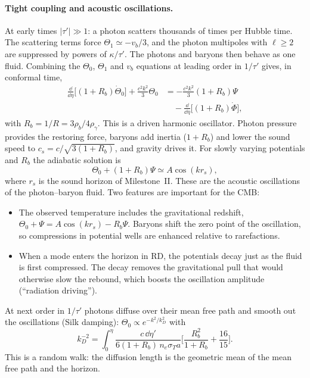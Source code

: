 \paragraph*{Tight coupling and acoustic oscillations.} At early times $|\tau'|\gg1$: a photon scatters thousands of
times per Hubble time. The scattering terms force $\Theta_1\simeq-v_b/3$, and the photon multipoles with $\ell\ge2$ are
suppressed by powers of $\kappa/\tau'$. The photons and baryons then behave as one fluid. Combining the $\Theta_0$,
$\Theta_1$ and $v_b$ equations at leading order in $1/\tau'$ gives, in conformal time,
\begin{align}
\frac{\dd}{\dd\eta}\Big[(1+R_b)\dot\Theta_0\Big] + \frac{c^2k^2}{3}\Theta_0
 &= -\frac{c^2k^2}{3}(1+R_b)\Psi \nonumber\\
 &\quad - \frac{\dd}{\dd\eta}\Big[(1+R_b)\dot\Phi\Big],
\label{eq:oscillator}
\end{align}
with $R_b=1/R=3\rho_b/4\rho_\gamma$. This is a driven harmonic oscillator. Photon pressure provides the restoring force,
baryons add inertia ($1+R_b$) and lower the sound speed to $c_s=c/\sqrt{3(1+R_b)}$, and gravity drives it. For slowly
varying potentials and $R_b$ the adiabatic solution is
\begin{equation}
\Theta_0+(1+R_b)\Psi \simeq A\cos(kr_s),
\label{eq:acoustic}
\end{equation}
where $r_s$ is the sound horizon of Milestone~II. These are the acoustic oscillations of the photon--baryon fluid. Two
features are important for the CMB:
\begin{itemize}
\item The observed temperature includes the gravitational redshift, $\Theta_0+\Psi=A\cos(kr_s)-R_b\Psi$. Baryons shift
      the zero point of the oscillation, so compressions in potential wells are enhanced relative to rarefactions.
\item When a mode enters the horizon in RD, the potentials decay just as the fluid is first compressed. The decay
      removes the gravitational pull that would otherwise slow the rebound, which boosts the oscillation amplitude
      (``radiation driving'').
\end{itemize}

At next order in $1/\tau'$ photons diffuse over their mean free path and smooth out the oscillations (Silk damping):
$\Theta_0\propto e^{-k^2/k_D^2}$ with~\cite{HuSugiyama1995}
\begin{equation}
k_D^{-2} = \int_0^\eta \frac{c\,\dd\eta'}{6(1+R_b)\,n_e\sigma_Ta}\Big[\frac{R_b^2}{1+R_b}+\frac{16}{15}\Big].
\label{eq:silk}
\end{equation}
This is a random walk: the diffusion length is the geometric mean of the mean free path and the horizon.

